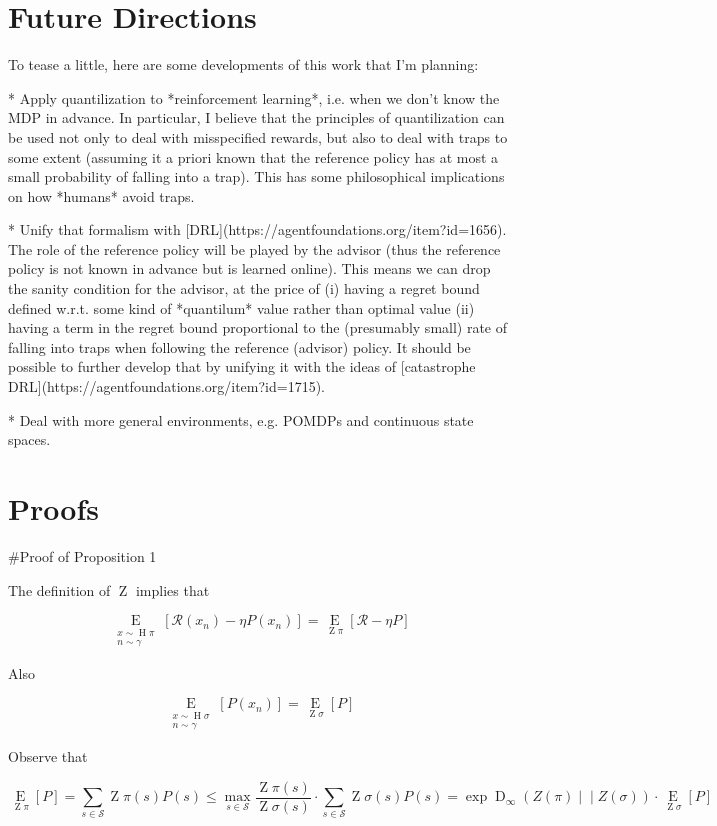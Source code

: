 \documentclass[a4paper]{article}
\newcommand{\AP}[1]{\left(#1\right)}
\newcommand{\AB}[1]{\left[#1\right]}
\newcommand{\Ea}[2]{\underset{#1}{\operatorname{E}}\AB{#2}}
\newcommand{\RD}[3]{\operatorname{D}_{#1}\AP{#2\middle\vert\middle\vert#3}}
\newcommand{\St}{\mathcal{S}}
\newcommand{\R}{\mathcal{R}}
\newcommand{\Pe}{P}
\DeclareMathOperator{\Hi}{H}
\DeclareMathOperator{\Z}{Z}
\begin{document}
\section{Future Directions}

To tease a little, here are some developments of this work that I'm planning:

* Apply quantilization to *reinforcement learning*, i.e. when we don't know the MDP in advance. In particular, I believe that the principles of quantilization can be used not only to deal with misspecified rewards, but also to deal with traps to some extent (assuming it a priori known that the reference policy has at most a small probability of falling into a trap). This has some philosophical implications on how *humans* avoid traps.

* Unify that formalism with [DRL](https://agentfoundations.org/item?id=1656). The role of the reference policy will be played by the advisor (thus the reference policy is not known in advance but is learned online). This means we can drop the sanity condition for the advisor, at the price of (i) having a regret bound defined w.r.t. some kind of *quantilum* value rather than optimal value (ii) having a term in the regret bound proportional to the (presumably small) rate of falling into traps when following the reference (advisor) policy. It should be possible to further develop that by unifying it with the ideas of [catastrophe DRL](https://agentfoundations.org/item?id=1715).

* Deal with more general environments, e.g. POMDPs and continuous state spaces.

\section{Proofs}

\#Proof of Proposition 1

The definition of $\Z$ implies that

$$\Ea{\substack{x\sim\Hi{\pi}\\n\sim\gamma}}{\R\AP{x_n}-\eta\Pe\AP{x_n}}=\Ea{\Z{\pi}}{\R-\eta P}$$

Also

$$\Ea{\substack{x\sim\Hi{\sigma}\\n\sim\gamma}}{\Pe\AP{x_n}}=\Ea{\Z{\sigma}}{P}$$

Observe that

$$\Ea{\Z{\pi}}{P} = \sum_{s\in\St}\Z{\pi}(s)P(s) \leq \max_{s \in \St}\frac{\Z{\pi}(s)}{\Z{\sigma}(s)}\cdot\sum_{s\in\St}\Z{\sigma}(s)P(s) = \exp{\RD{\infty}{Z(\pi)}{Z(\sigma)}} \cdot \Ea{\Z{\sigma}}{P}$$
\end{document}
